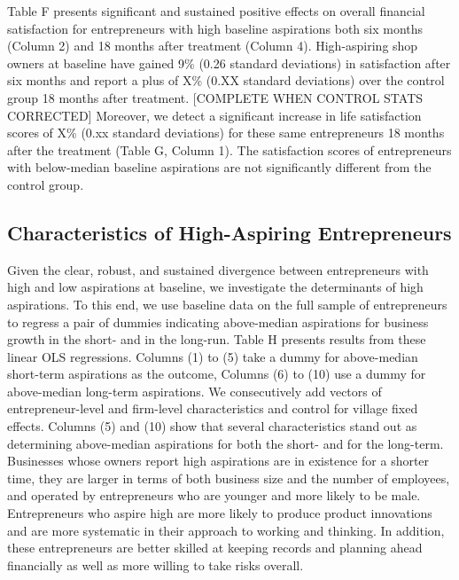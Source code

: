 \documentclass[11.5pt]{article}
\begin{document}
Table F presents significant and sustained positive effects on overall financial satisfaction for entrepreneurs with high baseline aspirations both six months (Column 2) and 18 months after treatment (Column 4). High-aspiring shop owners at baseline have gained 9\% (0.26 standard deviations) in satisfaction after six months and report a plus of X\% (0.XX standard deviations) over the control group 18 months after treatment. [COMPLETE WHEN CONTROL STATS CORRECTED] Moreover, we detect a significant increase in life satisfaction scores of X\% (0.xx standard deviations) for these same entrepreneurs 18 months after the treatment (Table G, Column 1). The satisfaction scores of entrepreneurs with below-median baseline aspirations are not significantly different from the control group.

\subsection{Characteristics of High-Aspiring Entrepreneurs}

Given the clear, robust, and sustained divergence between entrepreneurs with high and low aspirations at baseline, we investigate the determinants of high aspirations. To this end, we use baseline data on the full sample of entrepreneurs to regress a pair of dummies indicating above-median aspirations for business growth in the short- and in the long-run. Table H presents results from these linear OLS regressions. Columns (1) to (5) take a dummy for above-median short-term aspirations as the outcome, Columns (6) to (10) use a dummy for above-median long-term aspirations. We consecutively add vectors of entrepreneur-level and firm-level characteristics and control for village fixed effects. Columns (5) and (10) show that several characteristics stand out as determining above-median aspirations for both the short- and for the long-term. Businesses whose owners report high aspirations are in existence for a shorter time, they are larger in terms of both business size and the number of employees, and operated by entrepreneurs who are younger and more likely to be male. Entrepreneurs who aspire high are more likely to produce product innovations and are more systematic in their approach to working and thinking. In addition, these entrepreneurs are better skilled at keeping records and planning ahead financially as well as more willing to take risks overall.


\end{document}

